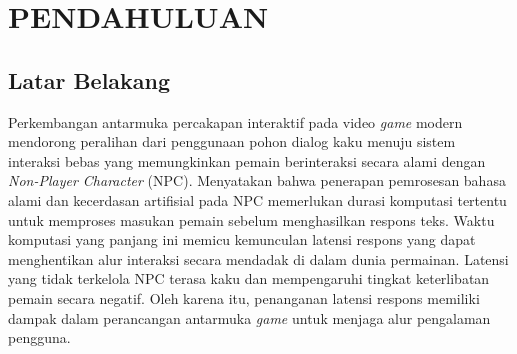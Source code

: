 %

\chapter{PENDAHULUAN}

\section{Latar Belakang}






Perkembangan antarmuka percakapan interaktif pada video \textit{game} modern mendorong peralihan dari penggunaan pohon dialog kaku menuju sistem interaksi bebas yang memungkinkan pemain berinteraksi secara alami dengan \textit{Non-Player Character} (NPC). \citet{csepregi2021effect} Menyatakan bahwa penerapan pemrosesan bahasa alami dan kecerdasan artifisial pada NPC memerlukan durasi komputasi tertentu untuk memproses masukan pemain sebelum menghasilkan respons teks. Waktu komputasi yang panjang ini memicu kemunculan latensi respons yang dapat menghentikan alur interaksi secara mendadak di dalam dunia permainan. Latensi yang tidak terkelola  NPC terasa kaku dan mempengaruhi tingkat keterlibatan pemain secara negatif. Oleh karena itu, penanganan latensi respons memiliki dampak dalam perancangan antarmuka \textit{game} untuk menjaga alur pengalaman pengguna.

